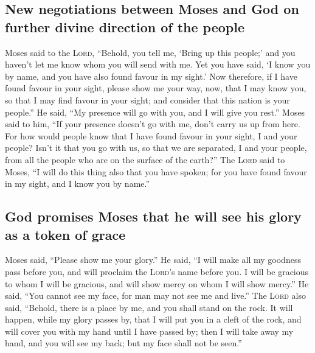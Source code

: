 \hypertarget{new-negotiations-between-moses-and-god-on-further-divine-direction-of-the-people}{%
\subsection{New negotiations between Moses and God on further divine
direction of the
people}\label{new-negotiations-between-moses-and-god-on-further-divine-direction-of-the-people}}

 Moses said to the \textsc{Lord}, ``Behold, you tell me,
`Bring up this people;' and you haven't let me know whom you will send
with me. Yet you have said, `I know you by name, and you have also found
favour in my sight.'  Now therefore, if I have found
favour in your sight, please show me your way, now, that I may know you,
so that I may find favour in your sight; and consider that this nation
is your people.''  He said, ``My presence will go with
you, and I will give you rest.''  Moses said to him, ``If
your presence doesn't go with me, don't carry us up from here.
 For how would people know that I have found favour in
your sight, I and your people? Isn't it that you go with us, so that we
are separated, I and your people, from all the people who are on the
surface of the earth?''  The \textsc{Lord} said to Moses,
``I will do this thing also that you have spoken; for you have found
favour in my sight, and I know you by name.''

\hypertarget{god-promises-moses-that-he-will-see-his-glory-as-a-token-of-grace}{%
\subsection{God promises Moses that he will see his glory as a token of
grace}\label{god-promises-moses-that-he-will-see-his-glory-as-a-token-of-grace}}

 Moses said, ``Please show me your glory.''
 He said, ``I will make all my goodness pass before you,
and will proclaim the \textsc{Lord}'s name before you. I will be
gracious to whom I will be gracious, and will show mercy on whom I will
show mercy.''  He said, ``You cannot see my face, for man
may not see me and live.''  The \textsc{Lord} also said,
``Behold, there is a place by me, and you shall stand on the rock.
 It will happen, while my glory passes by, that I will
put you in a cleft of the rock, and will cover you with my hand until I
have passed by;  then I will take away my hand, and you
will see my back; but my face shall not be seen.''

